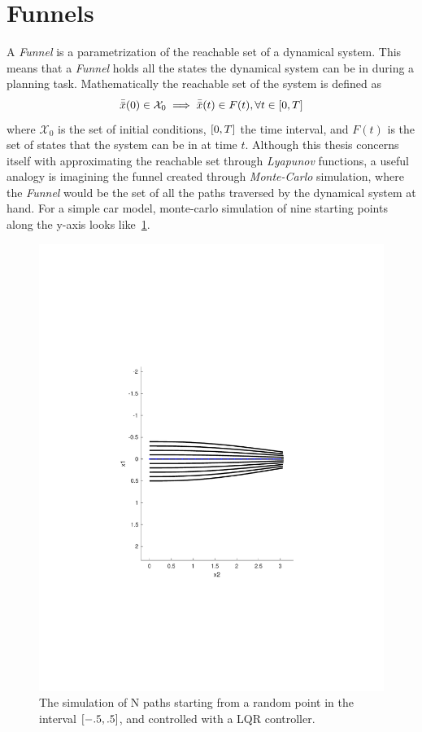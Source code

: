 \section{Funnels}

A \textit{Funnel} is a parametrization of the reachable set of a dynamical
system. This means that a \textit{Funnel} holds all the states the dynamical
system can be in during a planning task. Mathematically the reachable set of the
system is defined as
\[
  \bar{\bar{x}}(0) \in \mathcal{X}_0 \implies \bar{\bar{x}}(t) \in F(t), \forall t \in
  \lbrack0,T\rbrack
\]
where \(\mathcal{X}_0\) is the set of initial conditions, \(\lbrack0,T\rbrack\) the time
interval, and \(F(t)\) is the set of states that the system can be in at time
\(t\). Although this thesis concerns itself with approximating the reachable set
through \textit{Lyapunov} functions, a useful analogy is imagining the funnel
created through \textit{Monte-Carlo} simulation, where the \textit{Funnel} would
be the set of all the paths traversed by the dynamical system at hand. For a
simple car model, monte-carlo simulation of nine starting points along the
y-axis looks like~\cref{fig:monte-carlo-sim}.

\begin{figure}
  \centering \includegraphics[scale=.5]{figures/preliminaries/montecarlofunnel}
  \caption{The simulation of N paths starting from a random point in the
    interval \(\lbrack-.5,.5\rbrack\), and controlled with a LQR controller.}
  \label{fig:monte-carlo-sim}
\end{figure}

